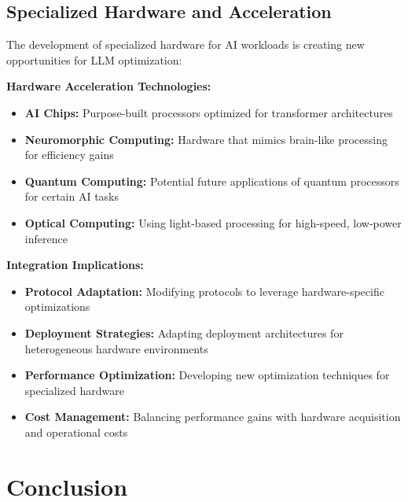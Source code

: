 
\subsection{Specialized Hardware and Acceleration}

The development of specialized hardware for AI workloads is creating new opportunities for LLM optimization:

\textbf{Hardware Acceleration Technologies:}
\begin{itemize}
    \item \textbf{AI Chips:} Purpose-built processors optimized for transformer architectures
    \item \textbf{Neuromorphic Computing:} Hardware that mimics brain-like processing for efficiency gains
    \item \textbf{Quantum Computing:} Potential future applications of quantum processors for certain AI tasks
    \item \textbf{Optical Computing:} Using light-based processing for high-speed, low-power inference
\end{itemize}

\textbf{Integration Implications:}
\begin{itemize}
    \item \textbf{Protocol Adaptation:} Modifying protocols to leverage hardware-specific optimizations
    \item \textbf{Deployment Strategies:} Adapting deployment architectures for heterogeneous hardware environments
    \item \textbf{Performance Optimization:} Developing new optimization techniques for specialized hardware
    \item \textbf{Cost Management:} Balancing performance gains with hardware acquisition and operational costs
\end{itemize}

\section{Conclusion}

